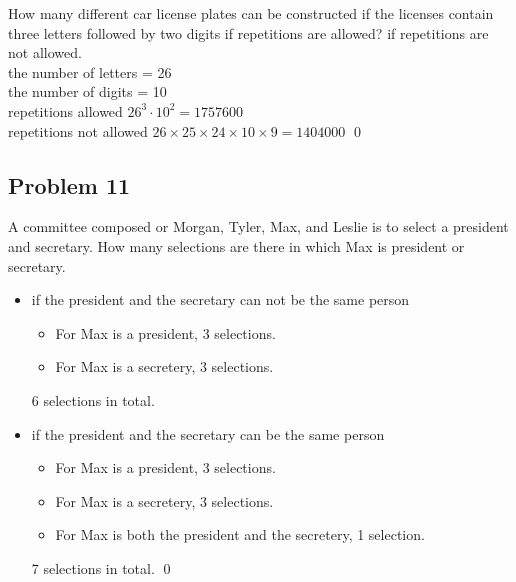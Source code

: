 \documentclass[handout]{beamer}
\begin{document}
        \begin{frame}[c]{\subsecname}
            How many different car license plates can be constructed if the licenses contain three letters followed by two digits if repetitions are allowed? if repetitions are not allowed.\\$\;$\\\pause
            the number of letters = 26\\
            the number of digits = 10\\\pause
            repetitions allowed $26^3\cdot10^2=1757600$\\
            repetitions not allowed $26\times25\times24\times10\times9=1404000$ \qed
        \end{frame}



    \subsection{Problem 11}
    
        \begin{frame}[c]{\subsecname}
            A committee composed or Morgan, Tyler, Max, and Leslie is to select a president
and secretary. How many selections are there in which Max is president or secretary.\\\pause
		 \begin{itemize}
		     \item
if the president and the secretary can not be the same person
                \begin{itemize}
                    \item For Max is a president, 3 selections.
                    \item For Max is a secretery, 3 selections.
                \end{itemize}
                6 selections in total.
                \item
if the president and the secretary can be the same person
                \begin{itemize}
                    \item For Max is a president, 3 selections.
                    \item For Max is a secretery, 3 selections.
                    \item For Max is both the president and the secretery, 1 selection.
                \end{itemize}
                7 selections in total. \qed
		\end{itemize}
        \end{frame}
\end{document}
